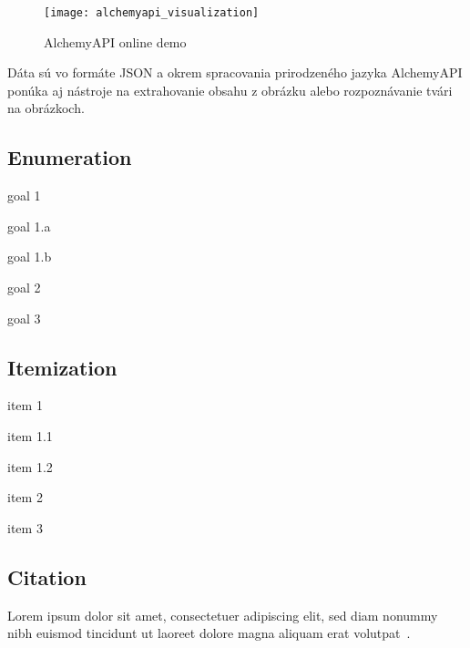 \begin{figure}[H]
\begin{center}\texttt{[image: alchemyapi\_visualization]}\end{center}
\caption[AlchemyAPI online demo]{AlchemyAPI online demo}\label{fig:alchemyapi_visualization}
\end{figure}

Dáta sú vo formáte JSON a okrem spracovania prirodzeného jazyka AlchemyAPI ponúka aj nástroje na extrahovanie obsahu z obrázku alebo rozpoznávanie tvári na obrázkoch.

\subsection{Enumeration}
\begin{my_enumerate}
	\item {goal 1}
	\begin{my_enumerate}
		\item {goal 1.a}
		\item {goal 1.b}
	\end{my_enumerate}
	\item {goal 2}
	\item {goal 3}
\end{my_enumerate}
\subsection{Itemization}
\begin{my_itemize}
	\item {item 1}
	\begin{my_itemize}
		\item {item 1.1}
		\item {item 1.2}
	\end{my_itemize}
	\item {item 2}
	\item {item 3}
\end{my_itemize}
\subsection{Citation}
Lorem ipsum dolor sit amet, consectetuer adipiscing elit, sed diam nonummy nibh euismod tincidunt ut laoreet dolore magna aliquam erat volutpat~\cite{1}.

